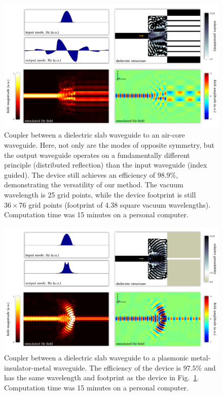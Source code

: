 \begin{figure}[htb]
    \centering
    \includegraphics[width=\textwidth]{p3/3}
    \caption{Coupler between a dielectric slab waveguide to 
            an air-core waveguide.
        Here, not only are the modes of opposite symmetry,
            but the output waveguide operates on a fundamentally different
            principle (distributed reflection) than the input waveguide 
            (index guided).
        The device still achieves an efficiency of $98.9\%$, demonstrating the
            versatility of our method.
        The vacuum wavelength is 25 grid points, 
            while the device footprint is still $36 \times 76$ grid points
            (footprint of 4.38 square vacuum wavelengths).
        Computation time was 15 minutes on a personal computer.
        }
        \label{fig:aircore}
\end{figure}
\begin{figure}[htb]
    \centering
    \includegraphics[width=\textwidth]{p3/4}
    \caption{Coupler between a dielectric slab waveguide to 
            a plasmonic metal-insulator-metal waveguide.
        The efficiency of the device is $97.5\%$ and 
            has the same wavelength and footprint as the device in
            Fig.~\ref{fig:aircore}.
        Computation time was 15 minutes on a personal computer.
        }
        \label{fig:mim}
\end{figure}
